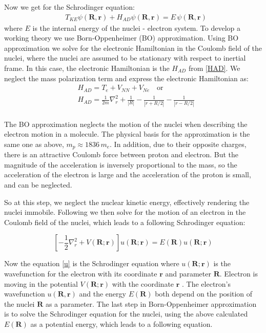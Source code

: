 Now we get for the Schrodinger equation:
\begin{equation}
\begin{split}
& T_{KE}\psi(\mathbf{R},\mathbf{r}) + H_{AD}\psi(\mathbf{R},\mathbf{r}) = E \, \psi(\mathbf{R},\mathbf{r})
\end{split}
\end{equation}
where $ E $ is the internal energy of the nuclei - electron system. To develop a working theory we use Born-Oppenheimer (BO) approximation. Using BO approximation we solve for the electronic Hamiltonian in the Coulomb field of the nuclei, where the nuclei are assumed to be stationary with respect to inertial frame. In this case, the electronic Hamiltonian is the $ H_{AD} $ from \eqref{HAD}. We neglect the mass polarization term and express the electronic Hamiltonian as:
\begin{equation}\label{HAD2}
\begin{split}
& H_{AD} = T_e + V_{NN} + V_{Ne}\,\,\,\,\text{ or }\\[.8em]
& H_{AD} = \frac{1}{2m}\nabla_r^2 + \frac{1}{\left|R\right|} - \frac{1}{\left|r + R/2\right|} - \frac{1}{\left|r - R/2\right|} \\[.8em]
\end{split}
\end{equation}

The BO approximation neglects the motion of the nuclei when describing the electron motion in a molecule. The physical basis for the approximation is the same one as above, $ m_p \approx 1836\, m_e $. In addition, due to their opposite charges, there is an attractive Coulomb force between proton and electron. But the magnitude of the acceleration is inversely proportional to the mass, so the acceleration of the electron is large and the acceleration of the  proton is small, and can be neglected.

So at this step, we neglect the nuclear kinetic energy, effectively rendering the nuclei immobile. Following \cite{Slater} we then solve for the motion of an electron in the Coulomb field of the nuclei, which leads to a following Schrodinger equation:

\begin{equation}\label{u}
\left[ -\frac{1}{2}\nabla_r^2 + V(\mathbf{R};\mathbf{r}) \right] u( \mathbf{R}; \mathbf{r} ) = E( \mathbf{R} ) u( \mathbf{R}; \mathbf{r} ) 
\end{equation}

Now the equation \eqref{u} is the Schrodinger equation where $ u( \mathbf{R}; \mathbf{r} ) $ is the wavefunction for the electron with its coordinate $ \textbf{r} $ and parameter $ \textbf{R} $. Electron is moving in the potential $ V(\mathbf{R};\mathbf{r})$ with the coordinate $ \mathbf{r} $ .  The electron's wavefunction $ u( \mathbf{R},\mathbf{r} ) $ and the energy $ E(\mathbf{R}) $ both depend on the position of the nuclei $ \mathbf{R} $ as a parameter. The last step in Born-Oppenheimer approximation is to solve the Schrodinger equation for the nuclei, using the above calculated $ E(\mathbf{R}) $ as a potential energy, which leads to a following equation.

